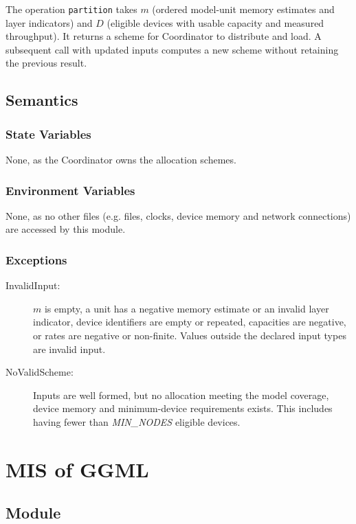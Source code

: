 \documentclass[12pt, titlepage]{article}
\begin{document}
The operation \texttt{partition} takes $m$ (ordered model-unit memory estimates
and layer indicators) and $D$ (eligible devices with usable capacity and measured
throughput). It returns a scheme for Coordinator to distribute and load.
A subsequent call with updated inputs computes a new scheme without retaining
the previous result.

\subsection{Semantics}

\subsubsection{State Variables}

None, as the Coordinator owns the allocation schemes.

\subsubsection{Environment Variables}

None, as no other files (e.g. files, clocks, device memory and network connections)
are accessed by this module.

\subsubsection{Exceptions}

\begin{description}
\item[InvalidInput:] $m$ is empty, a unit has a negative memory estimate or an
invalid layer indicator, device identifiers are empty or repeated, capacities
are negative, or rates are negative or non-finite. Values outside the declared
input types are invalid input.
\item[NoValidScheme:] Inputs are well formed, but no allocation meeting the
model coverage, device memory and minimum-device requirements exists. This includes
having fewer than \textit{MIN\_NODES} eligible devices.
\end{description}

\endgroup
\newpage

\section{MIS of GGML} \label{mis:ggml}

\subsection{Module}
\end{document}
